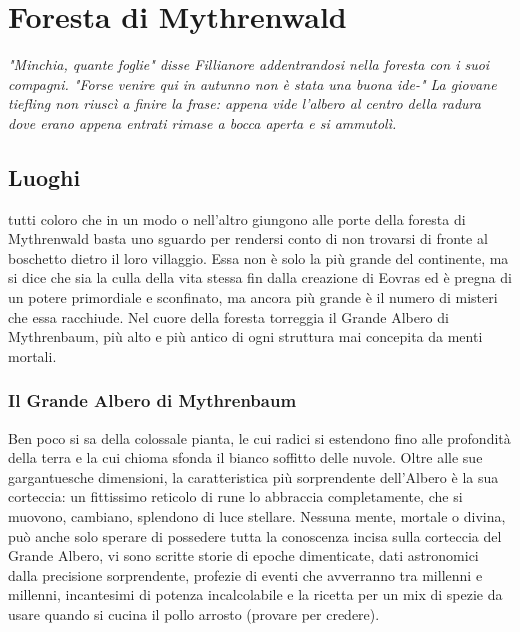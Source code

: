 \chapter{Foresta di Mythrenwald}

\begin{DndReadAloud}
  \it
  "Minchia, quante foglie" disse Fillianore addentrandosi nella foresta con i suoi compagni. "Forse venire qui in autunno non è stata una buona ide-" La giovane tiefling non riuscì a finire la frase: appena vide l'albero al centro della radura dove erano appena entrati rimase a bocca aperta e si ammutolì.
\end{DndReadAloud}

\section{Luoghi}

 tutti coloro che in un modo o nell'altro giungono alle porte della foresta di Mythrenwald basta uno sguardo per rendersi conto di non trovarsi di fronte al boschetto dietro il loro villaggio. Essa non è solo la più grande del continente, ma si dice che sia la culla della vita stessa fin dalla creazione di Eovras ed è pregna di un potere primordiale e sconfinato, ma ancora più grande è il numero di misteri che essa racchiude. Nel cuore della foresta torreggia il Grande Albero di Mythrenbaum, più alto e più antico di ogni struttura mai concepita da menti mortali.

\subsection{Il Grande Albero di Mythrenbaum}

Ben poco si sa della colossale pianta, le cui radici si estendono fino alle profondità della terra e la cui chioma sfonda il bianco soffitto delle nuvole. Oltre alle sue gargantuesche dimensioni, la caratteristica più sorprendente dell'Albero è la sua corteccia: un fittissimo reticolo di rune lo abbraccia completamente, che si muovono, cambiano, splendono di luce stellare. Nessuna mente, mortale o divina, può anche solo sperare di possedere tutta la conoscenza incisa sulla corteccia del Grande Albero, vi sono scritte storie di epoche dimenticate, dati astronomici dalla precisione sorprendente, profezie di eventi che avverranno tra millenni e millenni, incantesimi di potenza incalcolabile e la ricetta per un mix di spezie da usare quando si cucina il pollo arrosto (provare per credere).


